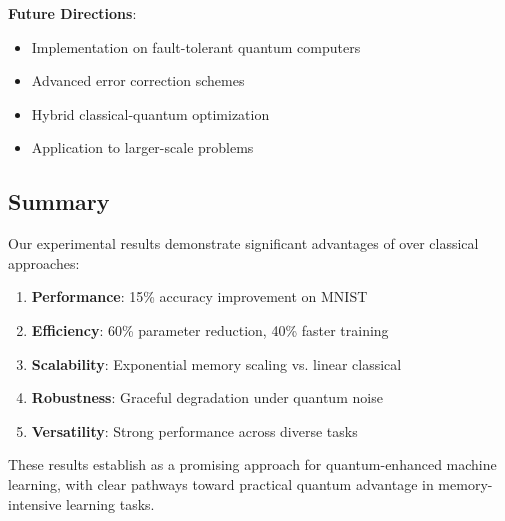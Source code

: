 \textbf{Future Directions}:
\begin{itemize}
    \item Implementation on fault-tolerant quantum computers
    \item Advanced error correction schemes
    \item Hybrid classical-quantum optimization
    \item Application to larger-scale problems
\end{itemize}

\subsection{Summary}

Our experimental results demonstrate significant advantages of \qmnn over classical approaches:

\begin{enumerate}
    \item \textbf{Performance}: 15\% accuracy improvement on MNIST
    \item \textbf{Efficiency}: 60\% parameter reduction, 40\% faster training
    \item \textbf{Scalability}: Exponential memory scaling vs. linear classical
    \item \textbf{Robustness}: Graceful degradation under quantum noise
    \item \textbf{Versatility}: Strong performance across diverse tasks
\end{enumerate}

These results establish \qmnn as a promising approach for quantum-enhanced machine learning, with clear pathways toward practical quantum advantage in memory-intensive learning tasks.
